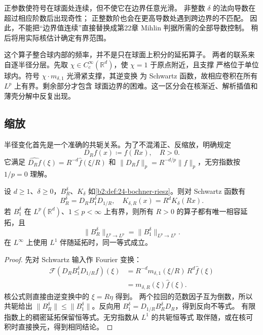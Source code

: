 \ProseParagraphBreak
正参数使符号在球面处连续，但不使它在边界任意光滑。
非整数 \(\delta\) 的法向导数在超过相应阶数后出现奇性；
正整数阶也会在更高导数处遇到跨边界的不匹配。
因此，不能把“边界值连续”直接替换成第22章 Mihlin 判据所需的全部导数控制。
稍后将用实际核估计确定有界范围。

\ProseParagraphBreak
这个算子整合球内部的频率，并不是只在球面上积分的延拓算子。
两者的联系来自逐半径分层。先取
\(\chi\in C_c^\infty(\mathbb R^d)\)，使 \(\chi=1\) 于原点附近，且支撑
严格位于单位球内。符号 \(\chi\cdot m_{\delta,1}\) 光滑紧支撑，其逆变换
为 Schwartz 函数，故相应卷积在所有 \(L^p\) 上有界。剩余部分才包含
球面边界的困难。这一区分会在核渐近、解析插值和薄壳分解中反复出现。

\subsection{缩放}
\label{b2:subsec:240102}

半径变化首先是一个准确的共轭关系。为了不混淆正、反缩放，明确规定
\[
 D_Rf(x)\coloneqq f(Rx),\quad R>0.
\]
它满足
\(\widehat{D_Rf}(\xi)=R^{-d}\widehat f(\xi/R)\) 和
\(\|D_Rf\|_p=R^{-d/p}\|f\|_p\)，无穷指数按 \(1/p=0\) 理解。

\begin{proposition}[半径共轭与一致常数]\label{b2:prop:24-dilation}
设 \(d\geq1\)、\(\delta\geq0\)，\(B_R^\delta\)、\(K_\delta\)
如\cref{b2:def:24-bochner-riesz}。则对 Schwartz 函数有
\[
 B_R^\delta=D_R B_1^\delta D_{1/R},\quad
 K_{\delta,R}(x)=R^dK_\delta(Rx).
\]
若 \(B_1^\delta\) 在 \(L^p(\mathbb R^d)\)、\(1\leq p<\infty\)
上有界，则所有 \(R>0\) 的算子都有唯一相容延拓，且
\[
 \|B_R^\delta\|_{L^p\to L^p}
       =\|B_1^\delta\|_{L^p\to L^p}.
\]
在 \(L^\infty\) 上使用 \(L^1\) 伴随延拓时，同一等式成立。
\end{proposition}
\begin{proof}
先对 Schwartz 输入作 Fourier 变换：
\[
 \begin{aligned}
 \mathcal F(D_R B_1^\delta D_{1/R}f)(\xi)
 &=R^{-d}m_{\delta,1}(\xi/R)\,
             R^d\widehat f(\xi)\\
 &=m_{\delta,R}(\xi)\widehat f(\xi).
 \end{aligned}
\]
核公式则直接由逆变换中的 \(\xi=R\eta\) 得到。
两个拉回的范数因子互为倒数，所以共轭给出
\(\|B_R^\delta\|\leq\|B_1^\delta\|\)。反向用
\(B_1^\delta=D_{1/R}B_R^\delta D_R\)，得到反向不等式。
有限指数上的稠密延拓保留恒等式。无穷指数从 \(L^1\) 的共轭恒等式
取伴随，或在核可积时直接换元，得到相同结论。
\end{proof}

